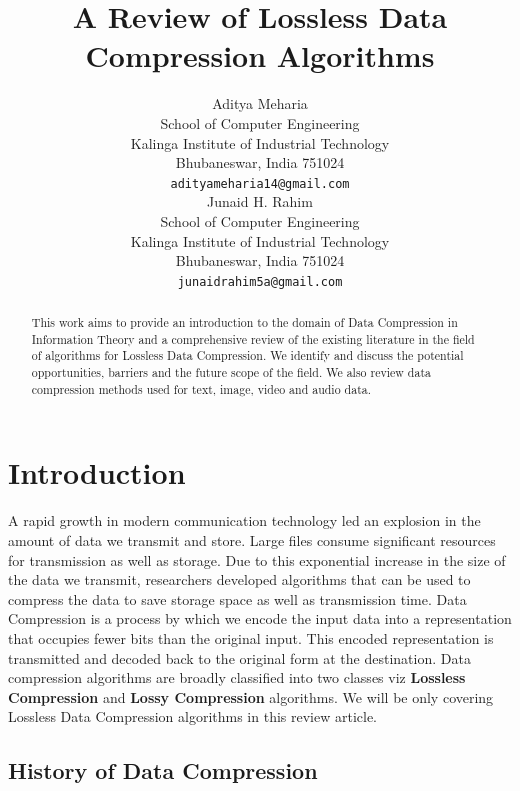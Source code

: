 \documentclass{article}
\title{A Review of Lossless Data Compression Algorithms}
\author{
	Aditya Meharia\\
	School of Computer Engineering\\
	Kalinga Institute of Industrial Technology\\
	Bhubaneswar, India 751024 \\
	\texttt{adityameharia14@gmail.com} \\
	\And
   	Junaid H. Rahim\\
	School of Computer Engineering\\
	Kalinga Institute of Industrial Technology\\
	Bhubaneswar, India 751024 \\
	\texttt{junaidrahim5a@gmail.com} \\	
}
\begin{document}
\maketitle

\begin{abstract}
	

This work aims to provide an introduction to the domain of Data Compression in Information Theory and a comprehensive review of the existing literature in the field of algorithms for Lossless Data Compression. We identify and discuss the potential opportunities, barriers and the future scope of the field. We also review data compression methods used for text, image, video and  audio data.




\end{abstract}



\section{Introduction}

A rapid growth in modern communication technology led an explosion in the amount of data we transmit and store. Large files consume significant resources for transmission as well as storage. Due to this exponential increase in the size of the data we transmit, researchers developed algorithms that can be used to compress the data to save storage space as well as transmission time. Data Compression is a process by which we encode the input data into a representation that occupies fewer bits than the original input. This encoded representation is transmitted and decoded back to the original form at the destination. Data compression algorithms are broadly classified into two classes viz \textbf{Lossless Compression} and \textbf{Lossy Compression} algorithms. We will be only covering Lossless Data Compression algorithms in this review article.

\subsection{History of Data Compression}
\end{document}
